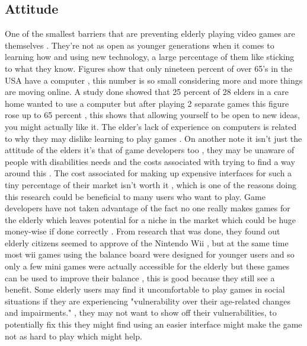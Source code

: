 \documentclass[journal]{IEEEtran}
\begin{document}
\subsection{Attitude}
One of the smallest barriers that are preventing elderly playing video games are themselves \cite{whitcomb_computer_1990}. They're not as open as younger generations when it comes to learning how and using new technology, a large percentage of them like sticking to what they know. Figures show that only nineteen percent of over 65's in the USA have a computer \cite{whitcomb_computer_1990}, this number is so small considering more and more things are moving online. A study done showed that 25 percent of 28 elders in a care home wanted to use a computer but after playing 2 separate games this figure rose up to 65 percent \cite{whitcomb_computer_1990}, this shows that allowing yourself to be open to new ideas, you might actually like it. The elder's lack of experience on computers is related to why they may dislike learning to play games \cite{gerling_exergame_2010}.
\newline
\newline
On another note it isn't just the attitude of the elders it's that of game developers too \cite{torrente_introducing_2011}, they may be unaware of people with disabilities needs and the costs associated with trying to find a way around this \cite{torrente_eyes-free_2012}. The cost associated for making up expensive interfaces for such a tiny percentage of their market isn't worth it \cite{torrente_eyes-free_2012}, which is one of the reasons doing this research could be beneficial to many users who want to play. Game developers have not taken advantage of the fact no one really makes games for the elderly which leaves potential for a niche in the market which could be huge money-wise if done correctly \cite{ijsselsteijn_digital_2007}.
\newline
From research that was done, they found out elderly citizens seemed to approve of the Nintendo Wii \cite{gerling_exergame_2010}, but at the same time most wii games using the balance board were designed for younger users and so only a few mini games were actually accessible for the elderly but these games can be used to improve their balance \cite{gerling_exergame_2010}, this is good because they still see a benefit.
\newline
Some elderly users may find it uncomfortable to play games in social situations if they are experiencing "vulnerability over their age-related changes and impairments." \cite{gerling_long-term_2015}, they may not want to show off their vulnerabilities, to potentially fix this they might find using an easier interface might make the game not as hard to play which might help. 
\end{document}
